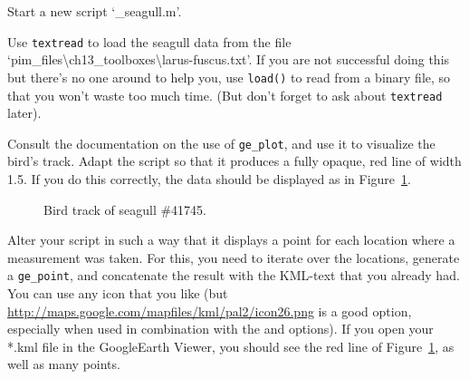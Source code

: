 \begin{action}
Start a new script `\_seagull.m'. 
\end{action}
\begin{action}
Use {\tt textread} to load the seagull data from the file `pim\_files\textbackslash{}ch13\_toolboxes\textbackslash{}larus-fuscus.txt'. If you are not successful doing this but there's no one around to help you, use {\tt load()} to read from a binary file, so that you won't waste too much time. (But don't forget to ask about {\tt textread} later).
\end{action}
\begin{action}
Consult the documentation on the use of {\tt ge\_plot}, and use it to visualize the bird's track. Adapt the script so that it produces a fully opaque, red line of width 1.5. If you do this correctly, the data should be displayed as in Figure~\ref{fig:larus-fuscus}.
\end{action}
\begin{figure}[!htbp]
  \centering
  \caption{Bird track of seagull \#41745.}\label{fig:larus-fuscus}
\end{figure}

\begin{action}
Alter your script in such a way that it displays a point for each location where a measurement was taken. For this, you need to iterate over the locations, generate a {\tt ge\_point}, and concatenate the result with the KML-text that you already had. You can use any icon that you like (but \url{http://maps.google.com/mapfiles/kml/pal2/icon26.png} is a good option, especially when used in combination with the {\tt {}} and {\tt {}} options). If you open your *.kml file in the GoogleEarth Viewer, you should see the red line of Figure~\ref{fig:larus-fuscus}, as well as many points.
\end{action}

